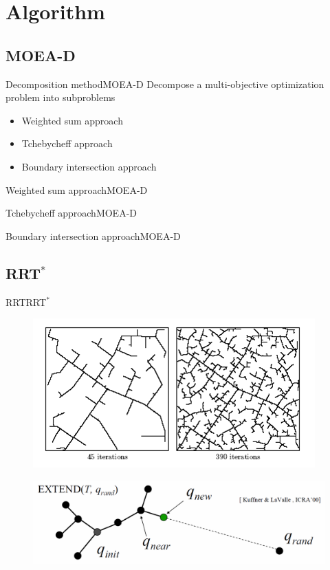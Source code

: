 \section{Algorithm}

\subsection{MOEA-D}

\begin{frame}{Decomposition method}{MOEA-D}
Decompose a multi-objective optimization problem into subproblems
\begin{itemize}
	\item Weighted sum approach
	\item Tchebycheff approach
	\item Boundary intersection approach
\end{itemize}
\end{frame}

\begin{frame}{Weighted sum approach}{MOEA-D}
	
\end{frame}

\begin{frame}{Tchebycheff approach}{MOEA-D}
	
\end{frame}

\begin{frame}{Boundary intersection approach}{MOEA-D}
	
\end{frame}

\subsection{RRT$^{*}$}

\begin{frame}{RRT}{RRT$^{*}$}
	\begin{figure}
		\centering
		\includegraphics[width=.5\linewidth]{figure/RRT_graph1}
		\label{fig:rrt}
	\end{figure}
	\begin{figure}
		\centering
		\includegraphics[width=.9\linewidth]{figure/rrt_extend}
		\label{fig:rrt}
	\end{figure}
\end{frame}

